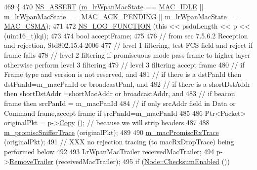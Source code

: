 \begin{DoxyCode}
469 \{
470   \hyperlink{assert_8h_a6dccdb0de9b252f60088ce281c49d052}{NS\_ASSERT} (\hyperlink{classns3_1_1LrWpanMac_ab5cdfd39de7397d658d300961dab3ed0}{m\_lrWpanMacState} == \hyperlink{group__lr-wpan_gga02ee7efd682937a8781f5e6101f61884a091c013ccdbce1011c1a4e141b227730}{MAC\_IDLE} || 
      \hyperlink{classns3_1_1LrWpanMac_ab5cdfd39de7397d658d300961dab3ed0}{m\_lrWpanMacState} == \hyperlink{group__lr-wpan_gga02ee7efd682937a8781f5e6101f61884ae46a1e995082569f76cb986500770ab8}{MAC\_ACK\_PENDING} || 
      \hyperlink{classns3_1_1LrWpanMac_ab5cdfd39de7397d658d300961dab3ed0}{m\_lrWpanMacState} == \hyperlink{group__lr-wpan_gga02ee7efd682937a8781f5e6101f61884a48f1c874cba8ef8b6332e9bd59e1341f}{MAC\_CSMA});
471 
472   \hyperlink{log-macros-disabled_8h_a90b90d5bad1f39cb1b64923ea94c0761}{NS\_LOG\_FUNCTION} (\textcolor{keyword}{this} << psduLength << p << (uint16\_t)lqi);
473 
474   \textcolor{keywordtype}{bool} acceptFrame;
475 
476   \textcolor{comment}{// from sec 7.5.6.2 Reception and rejection, Std802.15.4-2006}
477   \textcolor{comment}{// level 1 filtering, test FCS field and reject if frame fails}
478   \textcolor{comment}{// level 2 filtering if promiscuous mode pass frame to higher layer otherwise perform level 3 filtering}
479   \textcolor{comment}{// level 3 filtering accept frame}
480   \textcolor{comment}{// if Frame type and version is not reserved, and}
481   \textcolor{comment}{// if there is a dstPanId then dstPanId=m\_macPanId or broadcastPanI, and}
482   \textcolor{comment}{// if there is a shortDstAddr then shortDstAddr =shortMacAddr or broadcastAddr, and}
483   \textcolor{comment}{// if beacon frame then srcPanId = m\_macPanId}
484   \textcolor{comment}{// if only srcAddr field in Data or Command frame,accept frame if srcPanId=m\_macPanId}
485 
486   Ptr<Packet> originalPkt = p->\hyperlink{classns3_1_1Packet_a5d5c70802a5f77fc5f0001e0cfc1898b}{Copy} (); \textcolor{comment}{// because we will strip headers}
487 
488   \hyperlink{classns3_1_1LrWpanMac_a39b7fdffc860b187b9f316d78127d51f}{m\_promiscSnifferTrace} (originalPkt);
489 
490   \hyperlink{classns3_1_1LrWpanMac_af05f835a006d0fa06af15d1d504219a4}{m\_macPromiscRxTrace} (originalPkt);
491   \textcolor{comment}{// XXX no rejection tracing (to macRxDropTrace) being performed below}
492 
493   LrWpanMacTrailer receivedMacTrailer;
494   p->\hyperlink{classns3_1_1Packet_a2155e042083e9a17ad3b33f9fecb4be4}{RemoveTrailer} (receivedMacTrailer);
495   \textcolor{keywordflow}{if} (\hyperlink{classns3_1_1Node_a0515bfe9a3aeb6605d657ba855699815}{Node::ChecksumEnabled} ())

\end{DoxyCode}
